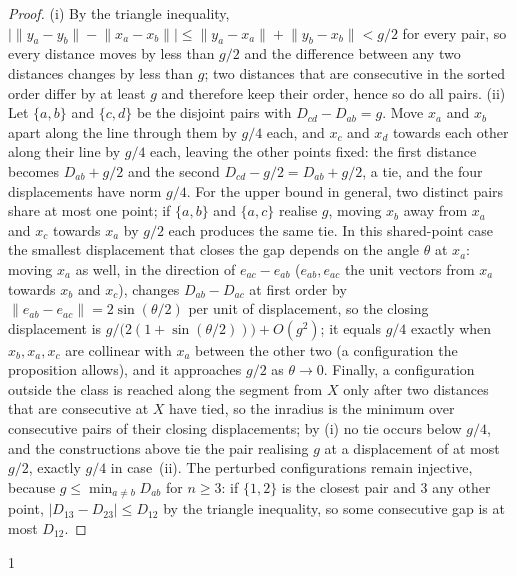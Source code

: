 \documentclass[11pt,a4paper]{article}
\providecommand{\HasClass}{0}
\theoremstyle{plain}
\theoremstyle{definition}
\theoremstyle{remark}
\begin{document}
\begin{proof}
(i) By the triangle inequality, $\bigl|\lVert y_a-y_b\rVert-\lVert x_a-x_b\rVert\bigr|\le\lVert y_a-x_a\rVert+\lVert y_b-x_b\rVert<g/2$ for every pair, so every distance moves by less than $g/2$ and the difference between any two distances changes by less than $g$; two distances that are consecutive in the sorted order differ by at least $g$ and therefore keep their order, hence so do all pairs. (ii) Let $\{a,b\}$ and $\{c,d\}$ be the disjoint pairs with $D_{cd}-D_{ab}=g$. Move $x_a$ and $x_b$ apart along the line through them by $g/4$ each, and $x_c$ and $x_d$ towards each other along their line by $g/4$ each, leaving the other points fixed: the first distance becomes $D_{ab}+g/2$ and the second $D_{cd}-g/2=D_{ab}+g/2$, a tie, and the four displacements have norm $g/4$. For the upper bound in general, two distinct pairs share at most one point; if $\{a,b\}$ and $\{a,c\}$ realise $g$, moving $x_b$ away from $x_a$ and $x_c$ towards $x_a$ by $g/2$ each produces the same tie. In this shared-point case the smallest displacement that closes the gap depends on the angle $\theta$ at $x_a$: moving $x_a$ as well, in the direction of $e_{ac}-e_{ab}$ ($e_{ab},e_{ac}$ the unit vectors from $x_a$ towards $x_b$ and $x_c$), changes $D_{ab}-D_{ac}$ at first order by $\lVert e_{ab}-e_{ac}\rVert=2\sin(\theta/2)$ per unit of displacement, so the closing displacement is $g/\bigl(2(1+\sin(\theta/2))\bigr)+O(g^2)$; it equals $g/4$ exactly when $x_b,x_a,x_c$ are collinear with $x_a$ between the other two (a configuration the proposition allows), and it approaches $g/2$ as $\theta\to0$. Finally, a configuration outside the class is reached along the segment from $X$ only after two distances that are consecutive at $X$ have tied, so the inradius is the minimum over consecutive pairs of their closing displacements; by (i) no tie occurs below $g/4$, and the constructions above tie the pair realising $g$ at a displacement of at most $g/2$, exactly $g/4$ in case~(ii). The perturbed configurations remain injective, because $g\le\min_{a\ne b}D_{ab}$ for $n\ge3$: if $\{1,2\}$ is the closest pair and $3$ any other point, $|D_{13}-D_{23}|\le D_{12}$ by the triangle inequality, so some consecutive gap is at most $D_{12}$.
\end{proof}

\if\HasClass1
\end{document}
